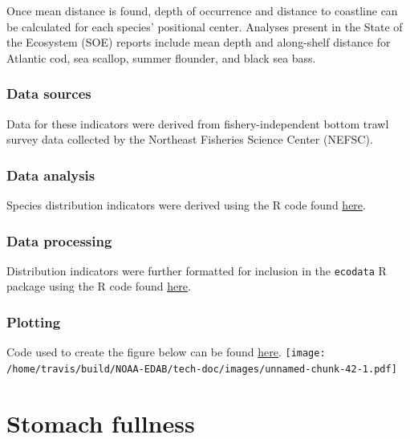 \documentclass[
]{book}
\begin{document}
Once mean distance is found, depth of occurrence and distance to coastline can be calculated for each species' positional center. Analyses present in the State of the Ecosystem (SOE) reports include mean depth and along-shelf distance for Atlantic cod, sea scallop, summer flounder, and black sea bass.

\hypertarget{data-sources-39}{%
\subsection{Data sources}\label{data-sources-39}}

Data for these indicators were derived from fishery-independent bottom trawl survey data collected by the Northeast Fisheries Science Center (NEFSC).

\hypertarget{data-analysis-37}{%
\subsection{Data analysis}\label{data-analysis-37}}

Species distribution indicators were derived using the R code found \href{https://github.com/NOAA-EDAB/tech-doc/blob/master/R/stored_scripts/species_distribution_analysis.R}{here}.

\hypertarget{data-processing-27}{%
\subsection{Data processing}\label{data-processing-27}}

Distribution indicators were further formatted for inclusion in the \texttt{ecodata} R package using the R code found \href{https://github.com/NOAA-EDAB/ecodata/blob/master/data-raw/get_species_dist.R}{here}.

\hypertarget{plotting-31}{%
\subsection{Plotting}\label{plotting-31}}

Code used to create the figure below can be found \href{https://github.com/NOAA-EDAB/ecodata/blob/master/chunk-scripts/macrofauna.Rmd-spec-dist.R}{here}.
\texttt{[image: /home/travis/build/NOAA-EDAB/tech-doc/images/unnamed-chunk-42-1.pdf]}

\hypertarget{stomach-fullness}{%
\chapter{Stomach fullness}\label{stomach-fullness}}
\end{document}
